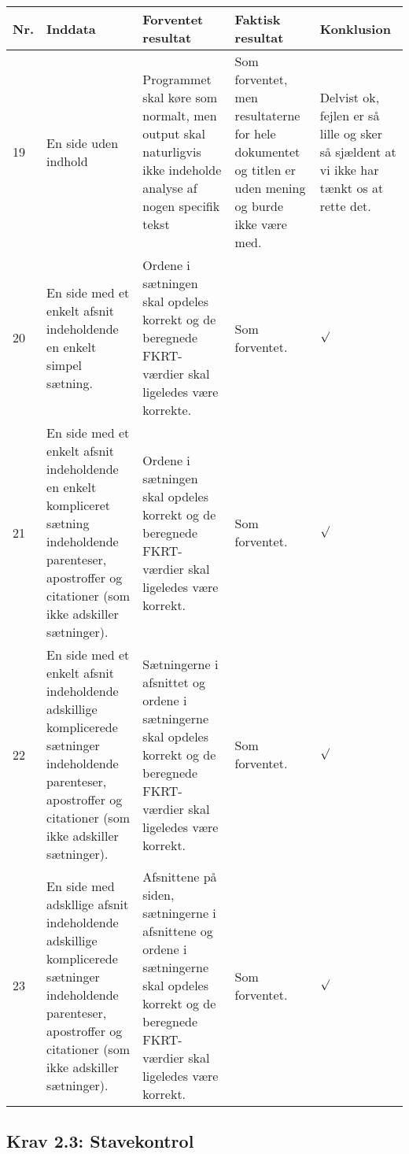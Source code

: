 \documentclass[a4paper,oneside,article]{memoir}
\begin{document}
\begin{landscape}
\begin{longtable}[c]{p{20pt}|p{220pt}|p{130pt}|p{130pt}|p{50pt}}
\textbf{Nr.} &
\textbf{Inddata} &
\textbf{Forventet resultat} &
\textbf{Faktisk resultat} &
\textbf{Konklusion} \\ \hline

19 &
En side uden indhold &
Programmet skal køre som normalt, men output skal naturligvis ikke
indeholde analyse af nogen specifik tekst &
Som forventet, men resultaterne for hele dokumentet og titlen er uden
mening og burde ikke være med. &
Delvist ok, fejlen er så lille og sker så sjældent at vi ikke har
tænkt os at rette det. \\ \hline

20 & 
En side med et enkelt afsnit indeholdende en enkelt simpel sætning. &
Ordene i sætningen skal opdeles korrekt og de beregnede FKRT-værdier skal
ligeledes være korrekte. &
Som forventet. &
$\surd$ \\ \hline

21 & 
En side med et enkelt afsnit indeholdende en enkelt kompliceret
sætning indeholdende parenteser, apostroffer og citationer (som ikke
adskiller sætninger). &
Ordene i sætningen skal opdeles korrekt og de beregnede FKRT-værdier
skal ligeledes være korrekt. &
Som forventet. &
$\surd$ \\ \hline

22 &
En side med et enkelt afsnit indeholdende adskillige
komplicerede sætninger indeholdende parenteser, apostroffer og
citationer (som ikke adskiller sætninger). &
Sætningerne i afsnittet og ordene i sætningerne skal opdeles korrekt
og de beregnede FKRT-værdier skal ligeledes være korrekt. &
Som forventet. &
$\surd$ \\ \hline

23 &
En side med adskllige afsnit indeholdende adskillige
komplicerede sætninger indeholdende parenteser, apostroffer og
citationer (som ikke adskiller sætninger). &
Afsnittene på siden, sætningerne i afsnittene og ordene i sætningerne
skal opdeles korrekt og de beregnede FKRT-værdier skal ligeledes være korrekt. &
Som forventet. &
$\surd$ \\ \hline

\end{longtable}

\subsection{Krav 2.3: Stavekontrol}


\end{landscape}
\end{document}
